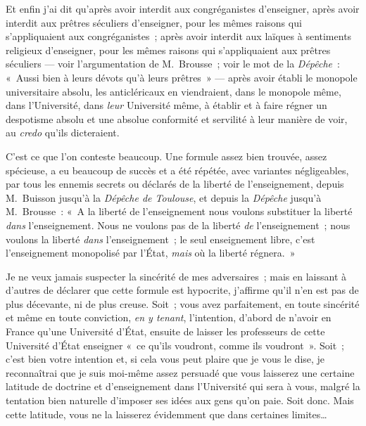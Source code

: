 \documentclass[french,twoside]{book} %
\begin{document}
\noindent Et enfin j’ai dit qu’après avoir interdit aux congréganistes d’enseigner, après avoir interdit aux prêtres séculiers d’enseigner, pour les mêmes raisons qui s’appliquaient aux congréganistes ; après avoir interdit aux laïques à sentiments religieux d’enseigner, pour les mêmes raisons qui s’appliquaient aux prêtres séculiers — voir l’argumentation de M. Brousse ; voir le mot de la \emph{Dépêche} : « Aussi bien à leurs dévots qu’à leurs prêtres » — après avoir établi le monopole universitaire absolu, les anticléricaux en viendraient, dans le monopole même, dans l’Université, dans {\itshape leur} Université même, à établir et à faire régner un despotisme absolu et une absolue conformité et servilité à leur manière de voir, au {\itshape credo} qu’ils dicteraient.\par
C’est ce que l’on conteste beaucoup. Une formule assez bien trouvée, assez spécieuse, a eu beaucoup de succès et a été répétée, avec variantes négligeables, par tous les ennemis secrets ou déclarés de la liberté de l’enseignement, depuis M. Buisson jusqu’à la \emph{Dépêche de Toulouse}, et depuis la \emph{Dépêche} jusqu’à M. Brousse : « A la liberté de l’enseignement nous voulons substituer la liberté {\itshape dans}  l’enseignement. Nous ne voulons pas de la liberté {\itshape de} l’enseignement ; nous voulons la liberté {\itshape dans} l’enseignement ; le seul enseignement libre, c’est l’enseignement monopolisé par l’État, {\itshape mais} où la liberté régnera. »\par
Je ne veux jamais suspecter la sincérité de mes adversaires ; mais en laissant à d’autres de déclarer que cette formule est hypocrite, j’affirme qu’il n’en est pas de plus décevante, ni de plus creuse. Soit ; vous avez parfaitement, en toute sincérité et même en toute conviction, {\itshape en y tenant}, l’intention, d’abord de n’avoir en France qu’une Université d’État, ensuite de laisser les professeurs de cette Université d’État enseigner « ce qu’ils voudront, comme ils voudront ». Soit ; c’est bien votre intention et, si cela vous peut plaire que je vous le dise, je reconnaîtrai que je suis moi-même assez persuadé que vous laisserez une certaine latitude de doctrine et d’enseignement dans l’Université qui sera à vous, malgré la tentation bien naturelle d’imposer ses idées aux gens qu’on paie. Soit donc. Mais cette latitude, vous ne la laisserez évidemment que dans certaines limites…\par
\end{document}
